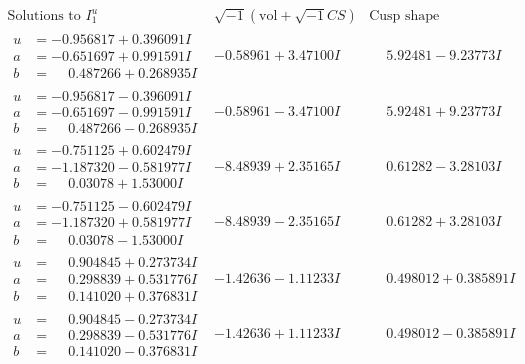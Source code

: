 \documentclass[1p]{elsarticle_modified}
\theoremstyle{definition}
\newcommand{\I}{\sqrt{-1}}
\begin{document}
$$\begin{array}{c|c|c}  
\text{Solutions to }I^u_{1}& \I (\text{vol} + \sqrt{-1}CS) & \text{Cusp shape}\\
 \hline 
\begin{aligned}
u &= -0.956817 + 0.396091 I \\
a &= -0.651697 + 0.991591 I \\
b &= \phantom{-}0.487266 + 0.268935 I\end{aligned}
 & -0.58961 + 3.47100 I & \phantom{-}5.92481 - 9.23773 I \\ \hline\begin{aligned}
u &= -0.956817 - 0.396091 I \\
a &= -0.651697 - 0.991591 I \\
b &= \phantom{-}0.487266 - 0.268935 I\end{aligned}
 & -0.58961 - 3.47100 I & \phantom{-}5.92481 + 9.23773 I \\ \hline\begin{aligned}
u &= -0.751125 + 0.602479 I \\
a &= -1.187320 - 0.581977 I \\
b &= \phantom{-}0.03078 + 1.53000 I\end{aligned}
 & -8.48939 + 2.35165 I & \phantom{-}0.61282 - 3.28103 I \\ \hline\begin{aligned}
u &= -0.751125 - 0.602479 I \\
a &= -1.187320 + 0.581977 I \\
b &= \phantom{-}0.03078 - 1.53000 I\end{aligned}
 & -8.48939 - 2.35165 I & \phantom{-}0.61282 + 3.28103 I \\ \hline\begin{aligned}
u &= \phantom{-}0.904845 + 0.273734 I \\
a &= \phantom{-}0.298839 + 0.531776 I \\
b &= \phantom{-}0.141020 + 0.376831 I\end{aligned}
 & -1.42636 - 1.11233 I & \phantom{-}0.498012 + 0.385891 I \\ \hline\begin{aligned}
u &= \phantom{-}0.904845 - 0.273734 I \\
a &= \phantom{-}0.298839 - 0.531776 I \\
b &= \phantom{-}0.141020 - 0.376831 I\end{aligned}
 & -1.42636 + 1.11233 I & \phantom{-}0.498012 - 0.385891 I \\ \hline\begin{aligned}

\end{aligned}
\end{array}$$
\end{document}
